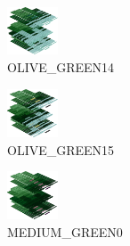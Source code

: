 \hspace{0.1cm}
\begin{minipage}[b]{0.15\linewidth}
\begin{figure}[H]                                                          
  \centering                                                             
  \begin{adjustbox}{width=1.5cm,center}                                   
  \includegraphics[width=1.5cm]{src/colorspace_colourflow/flows/colourflow_190-45.png}%
  \end{adjustbox}                                                        
\caption*{OLIVE\_GREEN14}                                           
\end{figure}                                                               
\end{minipage}
\hspace{0.1cm}
\begin{minipage}[b]{0.15\linewidth}
\begin{figure}[H]                                                          
  \centering                                                             
  \begin{adjustbox}{width=1.5cm,center}                                   
  \includegraphics[width=1.5cm]{src/colorspace_colourflow/flows/colourflow_191-45.png}%
  \end{adjustbox}                                                        
\caption*{OLIVE\_GREEN15}                                           
\end{figure}                                                               
\end{minipage}
\hspace{0.1cm}
\begin{minipage}[b]{0.15\linewidth}
\begin{figure}[H]                                                          
  \centering                                                             
  \begin{adjustbox}{width=1.5cm,center}                                   
  \includegraphics[width=1.5cm]{src/colorspace_colourflow/flows/colourflow_192-45.png}%
  \end{adjustbox}                                                        
\caption*{MEDIUM\_GREEN0}                                           
\end{figure}                                                               
\end{minipage}
